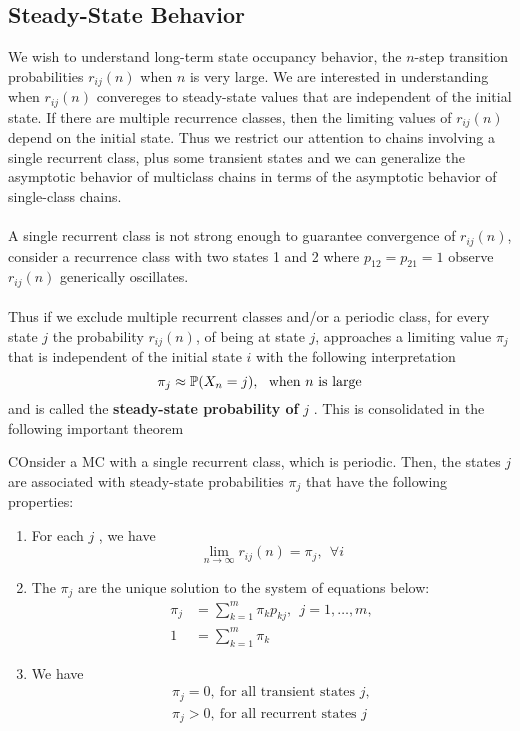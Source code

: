 \documentclass[11pt]{scrartcl}
\begin{document}
\subsection{Steady-State Behavior}
We wish to understand long-term state occupancy behavior, the $n$-step
transition probabilities $r_{ij}(n)$ when $n$ is very large. We are interested
in understanding when $r_{ij}(n)$ convereges to steady-state values that are
independent of the initial state. If there are multiple recurrence classes,
then the limiting values of $r_{ij}(n)$ depend on the initial state. Thus we
restrict our attention to chains involving a single recurrent class, plus some
transient states and we can generalize the asymptotic behavior of multiclass
chains in terms of the asymptotic behavior of single-class chains.\\\\ A single
recurrent class is not strong enough to guarantee convergence of $r_{ij}(n)$,
consider a recurrence class with two states 1 and 2 where $p_{12} = p_{21}=1$
observe $r_{ij}(n)$ generically oscillates. \\\\ Thus if we exclude
multiple recurrent classes and/or a periodic class, for every state $j$ the
probability $r_{ij}(n)$, of being at state $j$, approaches a limiting value
$\pi_{j}$ that is independent of the initial state $i$ with the following
interpretation \[
  \pi_{j} \approx \mathbb{P}(X_{n}=j), ~~ \text{when $n$ is large}
\] 
and is called the \textbf{steady-state probability of } $j$ . This is
consolidated in the following important theorem 
\begin{theorem}
  COnsider a MC with a single recurrent class, which is periodic. Then, the
  states $j$ are associated with steady-state probabilities $\pi_{j}$  that have
  the following properties:
  \begin{enumerate}[label=(\alph*)]
      \item For each $j$ , we have \[
          \lim_{n\to \infty}r_{ij}(n)= \pi_{j}, ~~ \forall i
      \]
      \item The $\pi_{j}$  are the unique solution to the system of equations
        below:
        \begin{align*}
          \pi_{j} &= \sum_{k=1}^{m} \pi_{k}p_{kj}, ~~ j=1,\ldots, m, \\
          1 &= \sum_{k=1}^{m} \pi_{k}
        \end{align*}
        \item We have \begin{align*}
            \pi_{j} = 0, ~ \text{for all transient states $j$}, \\
            \pi_{j} > 0, ~ \text{for all recurrent states $j$}
        \end{align*}
  \end{enumerate}
\end{theorem} 
\end{document}
